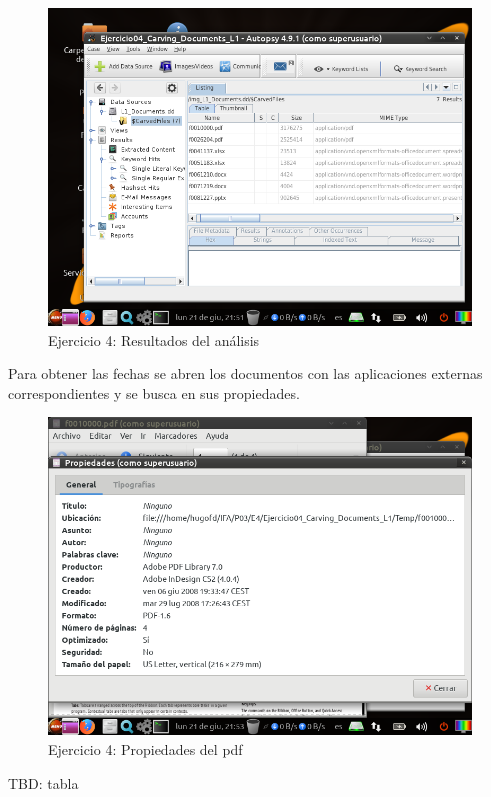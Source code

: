 \documentclass[11pt]{article}
\begin{document}
\begin{figure}[H]
  \caption{Ejercicio 4: Resultados del análisis}
  \centering
  \includegraphics[scale=0.7]{e4-5.png}
\end{figure}

Para obtener las fechas se abren los documentos con las aplicaciones externas correspondientes y se busca en sus propiedades.

\begin{figure}[H]
  \caption{Ejercicio 4: Propiedades del pdf}
  \centering
  \includegraphics[scale=0.7]{e4-6.png}
\end{figure}

TBD: tabla

\end{document}
